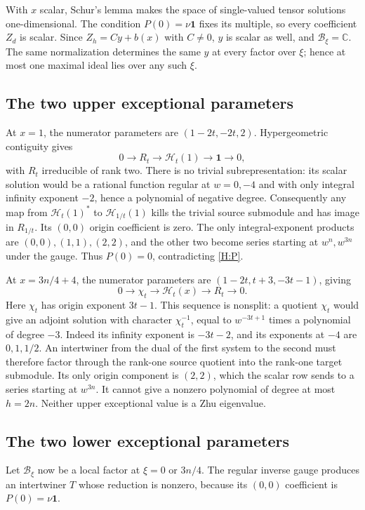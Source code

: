\documentclass[11pt]{article}
\newcommand{\C}{\mathbb C}\newcommand{\Q}{\mathbb Q}\newcommand{\Z}{\mathbb Z}
\newcommand{\one}{\mathbf1}\newcommand{\D}{\mathcal D}\newcommand{\Dcat}{\mathcal D}
\numberwithin{equation}{section}
\begin{document}
With $x$ scalar, Schur's lemma makes the space of single-valued tensor solutions one-dimensional. The condition $P(0)=\nu\one$ fixes its multiple, so every coefficient $Z_d$ is scalar. Since $Z_h=Cy+b(x)$ with $C\ne0$, $y$ is scalar as well, and $\mathcal B_\xi=\C$. The same normalization determines the same $y$ at every factor over $\xi$; hence at most one maximal ideal lies over any such $\xi$.

\subsection{The two upper exceptional parameters}
At $x=1$, the numerator parameters are $(1-2t,-2t,2)$. Hypergeometric contiguity \cite[Propositions~2.5 and~2.7]{H:BH} gives
\[
0\longrightarrow R_t\longrightarrow\mathcal H_t(1)
\longrightarrow\one\longrightarrow0,
\]
with $R_t$ irreducible of rank two. There is no trivial subrepresentation: its scalar solution would be a rational function regular at $w=0,-4$ and with only integral infinity exponent $-2$, hence a polynomial of negative degree. Consequently any map from $\mathcal H_t(1)^*$ to $\mathcal H_{1/t}(1)$ kills the trivial source submodule and has image in $R_{1/t}$. Its $(0,0)$ origin coefficient is zero. The only integral-exponent products are $(0,0),(1,1),(2,2)$, and the other two become series starting at $w^n,w^{3n}$ under the gauge. Thus $P(0)=0$, contradicting \eqref{H:P}.

At $x=3n/4+4$, the numerator parameters are $(1-2t,t+3,-3t-1)$, giving
\[
0\longrightarrow\chi_t\longrightarrow\mathcal H_t(x)
\longrightarrow R_t\longrightarrow0.
\]
Here $\chi_t$ has origin exponent $3t-1$. This sequence is nonsplit: a quotient $\chi_t$ would give an adjoint solution with character $\chi_t^{-1}$, equal to $w^{-3t+1}$ times a polynomial of degree $-3$. Indeed its infinity exponent is $-3t-2$, and its exponents at $-4$ are $0,1,1/2$. An intertwiner from the dual of the first system to the second must therefore factor through the rank-one source quotient into the rank-one target submodule. Its only origin component is $(2,2)$, which the scalar row sends to a series starting at $w^{3n}$. It cannot give a nonzero polynomial of degree at most $h=2n$. Neither upper exceptional value is a Zhu eigenvalue.

\subsection{The two lower exceptional parameters}
Let $\mathcal B_\xi$ now be a local factor at $\xi=0$ or $3n/4$. The regular inverse gauge produces an intertwiner $T$ whose reduction is nonzero, because its $(0,0)$ coefficient is $P(0)=\nu\one$.
\end{document}
